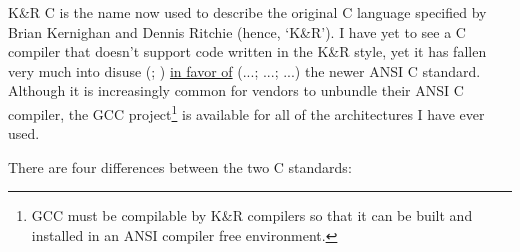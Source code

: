 K\&R C is the name now used to describe the original C language specified 
by Brian Kernighan and Dennis Ritchie (hence, `K\&R'). I have yet to 
see a C compiler that doesn't support code written in the K\&R style, yet 
it has fallen very much into disuse ({\MaQ{}}; {\MeQ{}}) \underline{in favor of}
({\MjQ{}}...; {\MbQ{}}...; {\MbQ{}}...) the newer ANSI C standard.
Although it is increasingly common for vendors to unbundle their ANSI C 
compiler, the GCC project\footnote{GCC must be compilable by K\&R compilers so 
that it can be built and installed in an ANSI compiler free environment.}
is available for all of the architectures I have ever used. 


There are four differences between the two C standards: 

